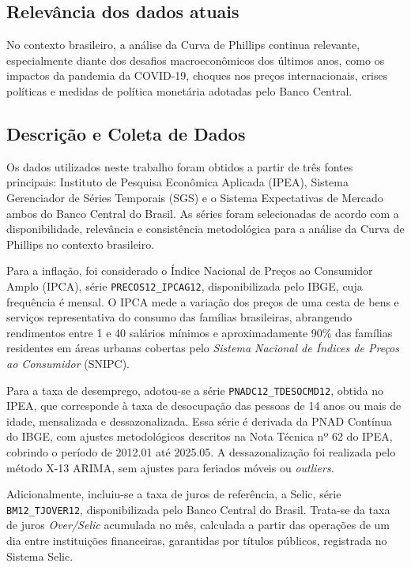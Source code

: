 \documentclass[12pt,oneside]{abntex2}
\begin{document}



\subsection*{\textbf{Relevância dos dados atuais}}

No contexto brasileiro, a análise da Curva de Phillips continua relevante, especialmente diante dos desafios macroeconômicos dos últimos anos, como os impactos da pandemia da COVID-19, choques nos preços internacionais, crises políticas e medidas de política monetária adotadas pelo Banco Central.

\subsection{\textbf{Descrição e Coleta de Dados}}

Os dados utilizados neste trabalho foram obtidos a partir de três fontes principais: Instituto de Pesquisa Econômica Aplicada (IPEA), Sistema Gerenciador de Séries Temporais (SGS) e o Sistema Expectativas de Mercado ambos do Banco Central do Brasil. As séries foram selecionadas de acordo com a disponibilidade, relevância e consistência metodológica para a análise da Curva de Phillips no contexto brasileiro.

Para a inflação, foi considerado o Índice Nacional de Preços ao Consumidor Amplo (IPCA), série \texttt{PRECOS12\_IPCAG12}, disponibilizada pelo IBGE, cuja frequência é mensal. O IPCA mede a variação dos preços de uma cesta de bens e serviços representativa do consumo das famílias brasileiras, abrangendo rendimentos entre 1 e 40 salários mínimos e aproximadamente 90\% das famílias residentes em áreas urbanas cobertas pelo \textit{Sistema Nacional de Índices de Preços ao Consumidor} (SNIPC).

Para a taxa de desemprego, adotou-se a série \texttt{PNADC12\_TDESOCMD12}, obtida no IPEA, que corresponde à taxa de desocupação das pessoas de 14 anos ou mais de idade, mensalizada e dessazonalizada. Essa série é derivada da PNAD Contínua do IBGE, com ajustes metodológicos descritos na Nota Técnica nº 62 do IPEA, cobrindo o período de 2012.01 até 2025.05. A dessazonalização foi realizada pelo método X-13 ARIMA, sem ajustes para feriados móveis ou \textit{outliers}.

Adicionalmente, incluiu-se a taxa de juros de referência, a Selic, série \texttt{BM12\_TJOVER12}, disponibilizada pelo Banco Central do Brasil. Trata-se da taxa de juros \textit{Over/Selic} acumulada no mês, calculada a partir das operações de um dia entre instituições financeiras, garantidas por títulos públicos, registrada no Sistema Selic.
\end{document}
